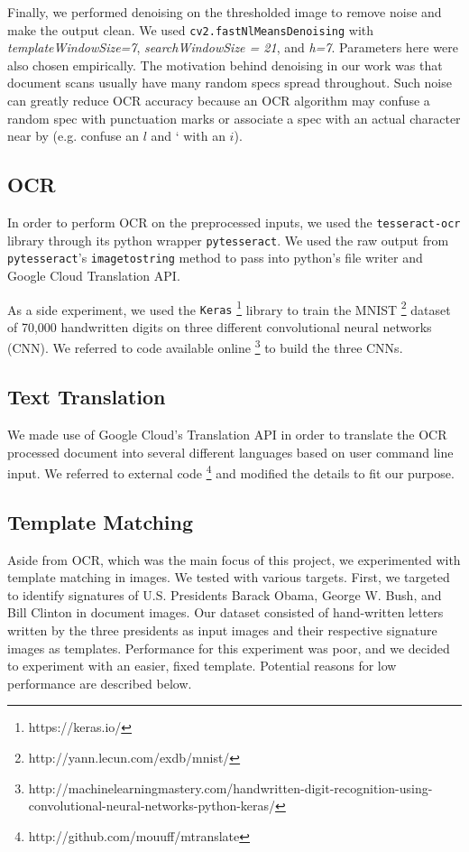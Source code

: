 \documentclass[11pt,letterpaper]{article}
\begin{document}
Finally, we performed denoising on the thresholded image to remove noise and make the output clean. We used {\tt cv2.fastNlMeansDenoising} with \textit{templateWindowSize=7}, \textit{searchWindowSize = 21}, and \textit{h=7}. Parameters here were also chosen empirically. The motivation behind denoising in our work was that document scans usually have many random specs spread throughout. Such noise can greatly reduce OCR accuracy because an OCR algorithm may confuse a random spec with punctuation marks or associate a spec with an actual character near by (e.g. confuse an $l$ and ` with an $i$).

\subsection{OCR}

In order to perform OCR on the preprocessed inputs, we used the {\tt tesseract-ocr} library through its python wrapper {\tt pytesseract}. We used the raw output from {\tt pytesseract}'s {\tt image\textunderscore to\textunderscore string} method to pass into python's file writer and Google Cloud Translation API.

As a side experiment, we used the {\tt Keras} \footnote{https://keras.io/} library to train the MNIST \footnote{http://yann.lecun.com/exdb/mnist/} dataset of 70,000 handwritten digits on three different convolutional neural networks (CNN). We referred to code available online \footnote{http://machinelearningmastery.com/handwritten-digit-recognition-using-convolutional-neural-networks-python-keras/} to build the three CNNs.

\subsection{Text Translation}

We made use of Google Cloud's Translation API in order to translate the OCR processed document into several different languages based on user command line input. We referred to external code \footnote{http://github.com/mouuff/mtranslate} and modified the details to fit our purpose.

\subsection{Template Matching}

Aside from OCR, which was the main focus of this project, we experimented with template matching in images. We tested with various targets. First, we targeted to identify signatures of U.S. Presidents Barack Obama, George W. Bush, and Bill Clinton in document images. Our dataset consisted of hand-written letters written by the three presidents as input images and their respective signature images as templates. Performance for this experiment was poor, and we decided to experiment with an easier, fixed template. Potential reasons for low performance are described below.
\end{document}
